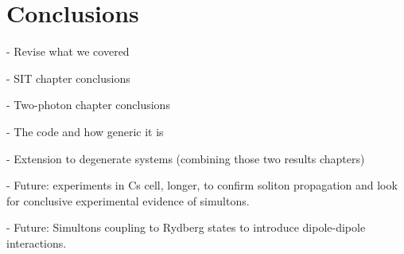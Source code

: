 \chapter[Conclusions]
  {Conclusions}
  \label{chp:conclusions}

  - Revise what we covered

  - SIT chapter conclusions

  - Two-photon chapter conclusions

  - The code and how generic it is

  - Extension to degenerate systems (combining those two results chapters)

  - Future: experiments in Cs cell, longer, to confirm soliton propagation and look
  for conclusive experimental evidence of simultons.

  - Future: Simultons coupling to Rydberg states to introduce dipole-dipole interactions.